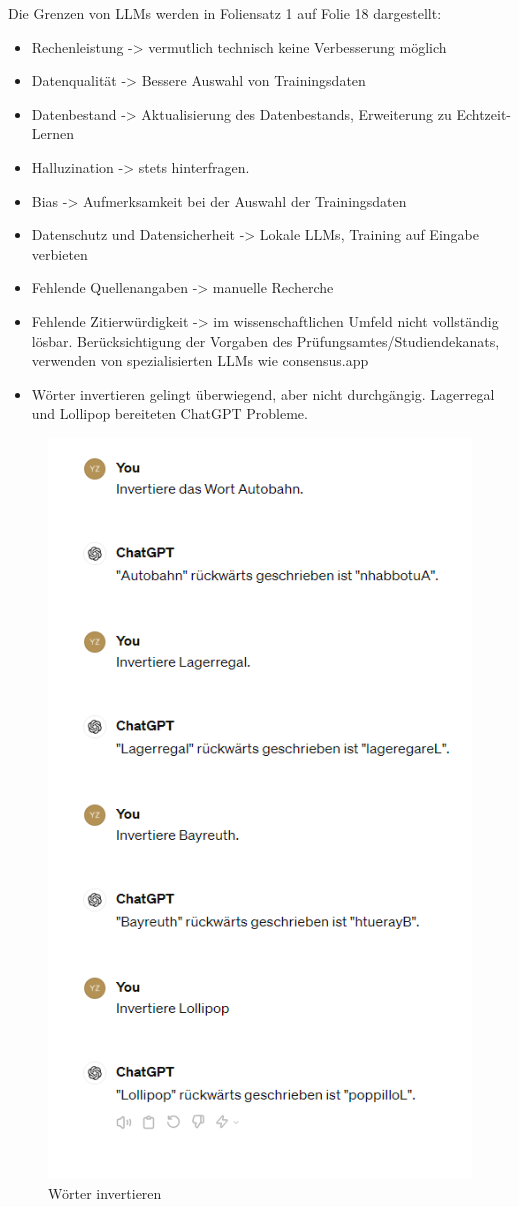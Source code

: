 \documentclass[12pt,ngerman]{AssignmentClass}
\begin{document}
        \vspace{5mm}
        Die Grenzen von LLMs werden in Foliensatz 1 auf Folie 18 dargestellt:
        \begin{itemize}
            \item Rechenleistung -> vermutlich technisch keine Verbesserung möglich
            \item Datenqualität -> Bessere Auswahl von Trainingsdaten
            \item Datenbestand -> Aktualisierung des Datenbestands, Erweiterung zu Echtzeit-Lernen
            \item Halluzination -> stets hinterfragen.
            \item Bias -> Aufmerksamkeit bei der Auswahl der Trainingsdaten
            \item Datenschutz und Datensicherheit -> Lokale LLMs, Training auf Eingabe verbieten
            \item Fehlende Quellenangaben -> manuelle Recherche
            \item Fehlende Zitierwürdigkeit -> im wissenschaftlichen Umfeld nicht vollständig lösbar. Berücksichtigung der Vorgaben des Prüfungsamtes/Studiendekanats, verwenden von spezialisierten LLMs wie consensus.app
        \end{itemize}

        \begin{itemize}
            \item Wörter invertieren gelingt überwiegend, aber nicht durchgängig. Lagerregal und Lollipop bereiteten ChatGPT Probleme.
        \end{itemize}
        
        \begin{figure}
            \centering
            \includegraphics[width=0.5\linewidth]{2024-04-22 09_50_43-ChatGPT.png}
            \caption{Wörter invertieren}
            \label{fig:inverted_words}
        \end{figure}
\end{document}
